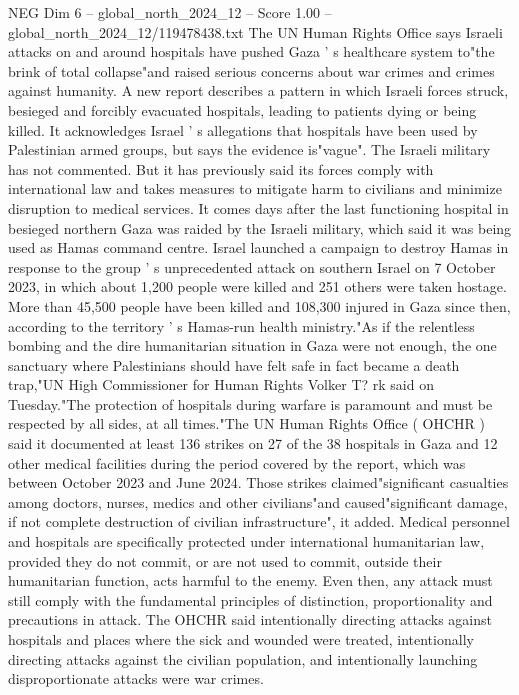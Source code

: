 \begin{textsample}{NEG Dim 6 – global\_north\_2024\_12 – Score 1.00 – global\_north\_2024\_12/119478438.txt}  \label{ex:f6_neg_185}
The UN Human Rights Office says Israeli attacks on and around hospitals have pushed Gaza ' s healthcare system to"the brink of total collapse"and raised serious concerns about war crimes and crimes against humanity.
A new report describes a pattern in which Israeli forces struck, besieged and forcibly evacuated hospitals, leading to patients dying or being killed.
It acknowledges Israel ' s allegations that hospitals have been used by Palestinian armed groups, but says the evidence is"vague".
The Israeli military has not commented.
But it has previously said its forces comply with international law and takes measures to mitigate harm to civilians and minimize disruption to medical services.
It comes days after the last functioning hospital in besieged northern Gaza was raided by the Israeli military, which said it was being used as Hamas command centre.
Israel launched a campaign to destroy Hamas in response to the group ' s unprecedented attack on southern Israel on 7 October 2023, in which about 1,200 people were killed and 251 others were taken hostage.
More than 45,500 people have been killed and 108,300 injured in Gaza since then, according to the territory ' s Hamas-run health ministry."As if the relentless bombing and the dire humanitarian situation in Gaza were not enough, the one sanctuary where Palestinians should have felt safe in fact became a death trap,"UN High Commissioner for Human Rights Volker T? rk said on Tuesday."The protection of hospitals during warfare is paramount and must be respected by all sides, at all times."The UN Human Rights Office ( OHCHR ) said it documented at least 136 strikes on 27 of the 38 hospitals in Gaza and 12 other medical facilities during the period covered by the report, which was between October 2023 and June 2024.
Those strikes claimed"significant casualties among doctors, nurses, medics and other civilians"and caused"significant damage, if not complete destruction of civilian infrastructure", it added.
Medical personnel and hospitals are specifically protected under international humanitarian law, provided they do not commit, or are not used to commit, outside their humanitarian function, acts harmful to the enemy.
Even then, any attack must still comply with the fundamental principles of distinction, proportionality and precautions in attack.
The OHCHR said intentionally directing attacks against hospitals and places where the sick and wounded were treated, intentionally directing attacks against the civilian population, and intentionally launching disproportionate attacks were war crimes.

\end{textsample}
